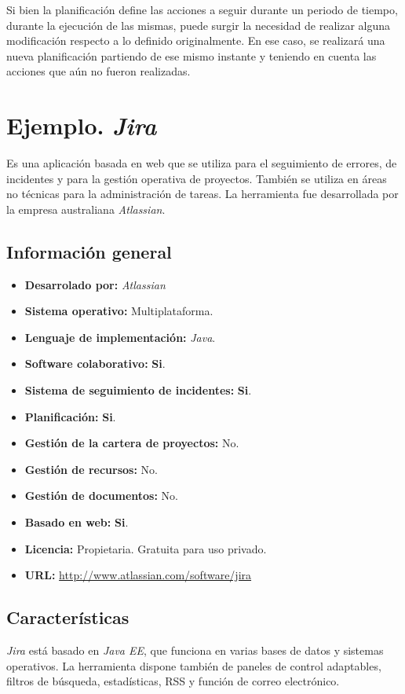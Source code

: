\documentclass[11pt,a4paper,spanish,twoside]{report}
\begin{document}
Si bien la planificación define las acciones a seguir durante un periodo de
tiempo, durante la ejecución de las mismas, puede surgir la necesidad de
realizar alguna modificación respecto a lo definido originalmente. En ese
caso, se realizará una nueva planificación partiendo de ese mismo instante y
teniendo en cuenta las acciones que aún no fueron realizadas.

\section{Ejemplo. \emph{Jira}}
Es una aplicación basada en web que se utiliza para el seguimiento de errores,
de incidentes y para la gestión operativa de proyectos. También se utiliza en
áreas no técnicas para la administración de tareas. La herramienta fue
desarrollada por la empresa australiana \emph{Atlassian}. \cite{WJI}

  \subsection{Información general}
    \begin{itemize}
		\item \textbf{Desarrolado por:} \emph{Atlassian}
		\item \textbf{Sistema operativo:} Multiplataforma.
		\item \textbf{Lenguaje de implementación:} \emph{Java}.
    \item \textbf{Software colaborativo:} \textbf{Si}.
    \item \textbf{Sistema de seguimiento de incidentes:} \textbf{Si}.
		\item \textbf{Planificación:} \textbf{Si}.
		\item \textbf{Gestión de la cartera de proyectos:} No.
		\item \textbf{Gestión de recursos:} No.
		\item \textbf{Gestión de documentos:} No.
		\item \textbf{Basado en web:} \textbf{Si}.
		\item \textbf{Licencia:} Propietaria. Gratuita para uso privado.
		\item \textbf{URL:} \url{http://www.atlassian.com/software/jira}
		\end{itemize}

	\subsection{Características}
	\emph{Jira} está basado en \emph{Java EE}, que funciona en varias bases de
	datos y	sistemas operativos. La herramienta dispone también de paneles de
	control	adaptables,	filtros de búsqueda, estadísticas, RSS y función de
	correo electrónico.
\end{document}
